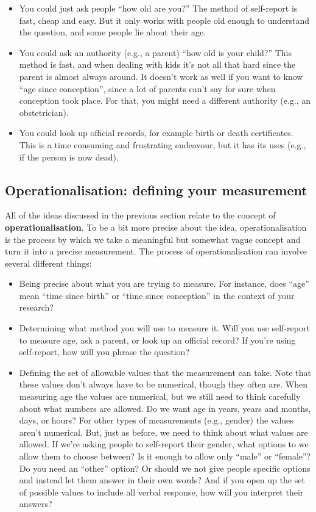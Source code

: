 \documentclass[
]{book}
\providecommand{\tightlist}{%
  \setlength{\itemsep}{0pt}\setlength{\parskip}{0pt}}
\begin{document}
\begin{itemize}
\tightlist
\item
  You could just ask people ``how old are you?'' The method of self-report is fast, cheap and easy. But it only works with people old enough to understand the question, and some people lie about their age.
\item
  You could ask an authority (e.g., a parent) ``how old is your child?'' This method is fast, and when dealing with kids it's not all that hard since the parent is almost always around. It doesn't work as well if you want to know ``age since conception'', since a lot of parents can't say for sure when conception took place. For that, you might need a different authority (e.g., an obstetrician).
\item
  You could look up official records, for example birth or death certificates. This is a time consuming and frustrating endeavour, but it has its uses (e.g., if the person is now dead).
\end{itemize}

\hypertarget{operationalisation-defining-your-measurement}{%
\subsection{Operationalisation: defining your measurement}\label{operationalisation-defining-your-measurement}}

All of the ideas discussed in the previous section relate to the concept of \textbf{operationalisation}. To be a bit more precise about the idea, operationalisation is the process by which we take a meaningful but somewhat vague concept and turn it into a precise measurement. The process of operationalisation can involve several different things:

\begin{itemize}
\item
  Being precise about what you are trying to measure. For instance, does ``age'' mean ``time since birth'' or ``time since conception'' in the context of your research?
\item
  Determining what method you will use to measure it. Will you use self-report to measure age, ask a parent, or look up an official record? If you're using self-report, how will you phrase the question?
\item
  Defining the set of allowable values that the measurement can take. Note that these values don't always have to be numerical, though they often are. When measuring age the values are numerical, but we still need to think carefully about what numbers are allowed. Do we want age in years, years and months, days, or hours? For other types of measurements (e.g., gender) the values aren't numerical. But, just as before, we need to think about what values are allowed. If we're asking people to self-report their gender, what options to we allow them to choose between? Is it enough to allow only ``male'' or ``female''? Do you need an ``other'' option? Or should we not give people specific options and instead let them answer in their own words? And if you open up the set of possible values to include all verbal response, how will you interpret their answers?
\end{itemize}
\end{document}
